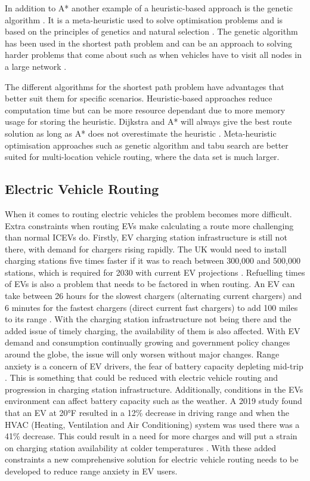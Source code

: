 \documentclass[11pt]{report}
\begin{document}
In addition to A* another example of a heuristic-based approach is the genetic algorithm \autocite{haupt2004practical}. It is a meta-heuristic used to solve optimisation problems and is based on the principles of genetics and natural selection \autocite{bagheri2008finding}\autocite{nha2012comparative}. The genetic algorithm has been used in the shortest path problem and can be an approach to solving harder problems that come about such as when vehicles have to visit all nodes in a large network \autocite{genAlgs1997}.

The different algorithms for the shortest path problem have advantages that better suit them for specific scenarios. Heuristic-based approaches reduce computation time but can be more resource dependant due to more memory usage for storing the heuristic. Dijkstra and A* will always give the best route solution as long as A* does not overestimate the heuristic \autocite{wang2013comprehensive}. Meta-heuristic optimisation approaches such as genetic algorithm and tabu search are better suited for multi-location vehicle routing, where the data set is much larger.

\subsection{Electric Vehicle Routing}

When it comes to routing electric vehicles the problem becomes more difficult. Extra constraints when routing EVs make calculating a route more challenging than normal ICEVs do. Firstly, EV charging station infrastructure is still not there, with demand for chargers rising rapidly. The UK would need to install charging stations five times faster if it was to reach between 300,000 and 500,000 stations, which is required for 2030 with current EV projections \autocite{charginUpPolicyExchange}. Refuelling times of EVs is also a problem that needs to be factored in when routing. An EV can take between 26 hours for the slowest chargers (alternating current chargers) and 6 minutes for the fastest chargers (direct current fast chargers) to add 100 miles to its range \autocite{lee2018charging}. With the charging station infrastructure not being there and the added issue of timely charging, the availability of them is also affected. With EV demand and consumption continually growing and government policy changes around the globe, the issue will only worsen without major changes. Range anxiety is a concern of EV drivers, the fear of battery capacity depleting mid-trip \autocite{neubauer2014impact}. This is something that could be reduced with electric vehicle routing and progression in charging station infrastructure. Additionally, conditions in the EVs environment can affect battery capacity such as the weather. A 2019 study found that an EV at 20°F resulted in a 12\% decrease in driving range and when the HVAC (Heating, Ventilation and Air Conditioning) system was used there was a 41\% decrease. This could result in a need for more charges and will put a strain on charging station availability at colder temperatures \autocite{aaaEVWeather}. With these added constraints a new comprehensive solution for electric vehicle routing needs to be developed to reduce range anxiety in EV users.
\end{document}
